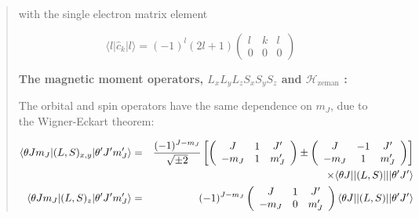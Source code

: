 \begin{quotation}
\noindent with the single electron matrix element

\begin{equation} \label{iccf1ematel}
\langle l | \hat{c}_k | l \rangle = (-1)^l (2l+1) \left( \begin{array}{ccc} l & k & l \\ 0 & 0 & 0
\end{array} \right)
\end{equation}

%
%
%
\item[\bf The magnetic moment operators, $L_x L_y L_z S_x S_y S_z$ and $\mathcal H_{\mathrm{zeman}}$ :]

The orbital and spin operators have the same dependence on $m_J$, due to the Wigner-Eckart theorem:

\begin{eqnarray}
\langle \theta Jm_J|(L,S)_{x,y}|\theta'J'm_J'\rangle &=& \frac{(-1)^{J-m_J}}{\sqrt{\pm 2}}
 \left[ \left( \begin{array}{ccc} J&1&J' \\ -m_J& 1&m'_J \end{array} \right) \pm \left( \begin{array}{ccc} J&-1&J' \\ -m_J&1&m'_J \end{array} \right) \right] \\ \nonumber  
 && \qquad \times \langle \theta J||(L,S)|||\theta'J'\rangle \\
    \langle \theta Jm_J|(L,S)_z|\theta'J'm_J'\rangle &=& (-1)^{J-m_J}
    \left( \begin{array}{ccc} J&1&J' \\ -m_J&0&m'_J \end{array} \right) \langle \theta J||(L,S)||\theta'J'\rangle
\end{eqnarray}


\end{quotation}
